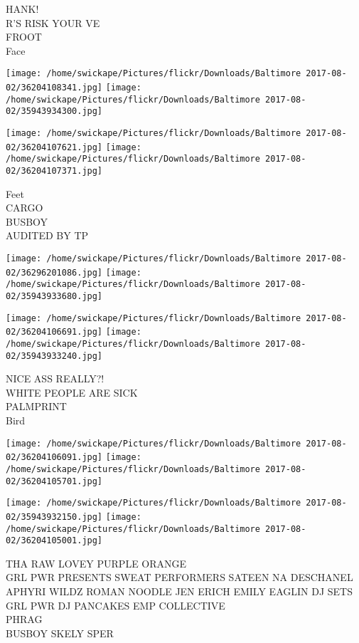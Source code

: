 \documentclass[10pt,letterpaper]{article}
\begin{document}
HANK!\\
R'S RISK YOUR VE\\
FROOT\\
Face\\
\pagebreak

\texttt{[image: /home/swickape/Pictures/flickr/Downloads/Baltimore 2017-08-02/36204108341.jpg]}
\texttt{[image: /home/swickape/Pictures/flickr/Downloads/Baltimore 2017-08-02/35943934300.jpg]}

\texttt{[image: /home/swickape/Pictures/flickr/Downloads/Baltimore 2017-08-02/36204107621.jpg]}
\texttt{[image: /home/swickape/Pictures/flickr/Downloads/Baltimore 2017-08-02/36204107371.jpg]}

Feet\\
CARGO\\
BUSBOY\\
AUDITED BY TP\\
\pagebreak

\texttt{[image: /home/swickape/Pictures/flickr/Downloads/Baltimore 2017-08-02/36296201086.jpg]}
\texttt{[image: /home/swickape/Pictures/flickr/Downloads/Baltimore 2017-08-02/35943933680.jpg]}

\texttt{[image: /home/swickape/Pictures/flickr/Downloads/Baltimore 2017-08-02/36204106691.jpg]}
\texttt{[image: /home/swickape/Pictures/flickr/Downloads/Baltimore 2017-08-02/35943933240.jpg]}

NICE ASS REALLY?!\\
WHITE PEOPLE ARE SICK\\
PALMPRINT\\
Bird\\
\pagebreak

\texttt{[image: /home/swickape/Pictures/flickr/Downloads/Baltimore 2017-08-02/36204106091.jpg]}
\texttt{[image: /home/swickape/Pictures/flickr/Downloads/Baltimore 2017-08-02/36204105701.jpg]}

\texttt{[image: /home/swickape/Pictures/flickr/Downloads/Baltimore 2017-08-02/35943932150.jpg]}
\texttt{[image: /home/swickape/Pictures/flickr/Downloads/Baltimore 2017-08-02/36204105001.jpg]}

THA RAW LOVEY PURPLE ORANGE\\
GRL PWR PRESENTS SWEAT PERFORMERS SATEEN  NA DESCHANEL APHYRI WILDZ ROMAN NOODLE JEN ERICH EMILY EAGLIN DJ SETS GRL PWR DJ PANCAKES EMP COLLECTIVE\\
PHRAG\\
BUSBOY SKELY SPER\\
\pagebreak
\end{document}
